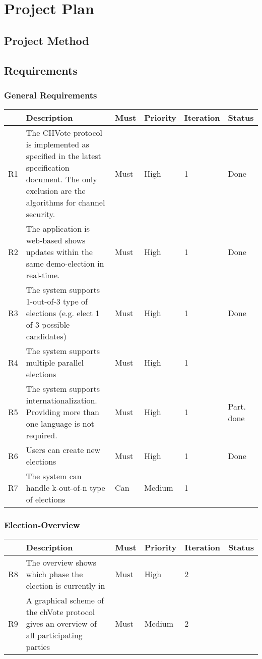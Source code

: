 \chapter{Project Plan}
\section{Project Method}
\section{Requirements}
\subsection{General Requirements}
\begin{longtable}{p{0.4cm}p{9cm}p{1cm}p{1cm}p{1cm}p{1cm}}
\hline
 & Description & Must & Priority & Iteration & Status\\
\hline
R1 & The CHVote protocol is implemented as specified in the latest specification document. The only exclusion are the algorithms for channel security. & Must & High & 1 & Done\\
R2 & The application is web-based shows updates within the same demo-election in real-time. & Must & High & 1 & Done\\
R3 & The system supports 1-out-of-3 type of elections (e.g. elect 1 of 3 possible candidates) & Must & High & 1 & Done\\
R4 & The system supports multiple parallel elections & Must & High & 1 & \\
R5 & The system supports internationalization. Providing more than one language is not required. & Must & High & 1 & Part. done\\
R6 & Users can create new elections & Must & High & 1 & Done \\
R7 & The system can handle k-out-of-n type of elections & Can & Medium & 1 & \\
\end{longtable}


\subsection{Election-Overview}
\begin{longtable}{p{0.4cm}p{9cm}p{1cm}p{1cm}p{1cm}p{1cm}}
\hline
 & Description & Must & Priority & Iteration & Status\\
\hline
R8 & The overview shows which phase the election is currently in & Must & High & 2 & \\
R9 & A graphical scheme of the chVote protocol gives an overview of all participating parties & Must & Medium & 2 & \\
\end{longtable}

